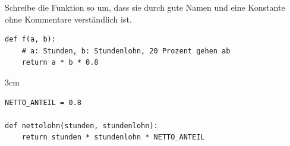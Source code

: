 \question[3]
Schreibe die Funktion so um, dass sie durch gute Namen und eine Konstante ohne Kommentare verständlich ist.
\begin{lstlisting}
def f(a, b):
    # a: Stunden, b: Stundenlohn, 20 Prozent gehen ab
    return a * b * 0.8
\end{lstlisting}
\begin{solutionbox}{3cm}
\begin{lstlisting}
NETTO_ANTEIL = 0.8

def nettolohn(stunden, stundenlohn):
    return stunden * stundenlohn * NETTO_ANTEIL
\end{lstlisting}
\end{solutionbox}
